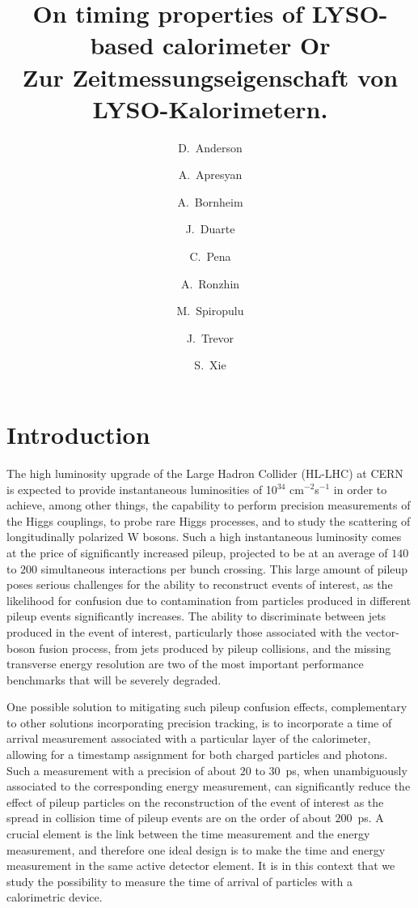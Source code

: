 \documentclass[12pt]{article}
\title{On timing properties of LYSO-based calorimeter Or\\Zur Zeitmessungseigenschaft von LYSO-Kalorimetern.}
\author[1]{D.~Anderson}
\author[1]{A.~Apresyan}
\author[1]{A.~Bornheim}
\author[1]{J.~Duarte}
\author[1]{C.~Pena}
\author[2]{A.~Ronzhin}
\author[1]{M.~Spiropulu}
\author[1]{J.~Trevor}
\author[1]{S.~Xie}
\affil[1]{California Institute of Technology, Pasadena, CA, USA}
\affil[2]{Fermi National Accelerator Laboratory, Batavia, IL, USA}
\date{}
\begin{document}
\maketitle
{}



\section{Introduction}

The high luminosity upgrade of the Large Hadron Collider (HL-LHC) at CERN~\cite{Rossi:1471000}
is expected to provide instantaneous luminosities of 10$^{34}$ cm$^{-2}$s$^{-1}$
in order to achieve, among other things, the capability to perform precision 
measurements of the Higgs couplings, to probe rare Higgs processes,
and to study the scattering of longitudinally polarized W bosons. Such a
high instantaneous luminosity comes at the price of significantly increased
pileup, projected to be at an average of $140$ to $200$ simultaneous 
interactions per bunch crossing. This large amount of pileup poses serious
challenges for the ability to reconstruct events of interest, as the 
likelihood for confusion due to contamination from particles produced
in different pileup events significantly increases. The ability to
discriminate between jets produced in the event of interest,
particularly those associated with the vector-boson fusion process,
from jets produced by pileup collisions, and the missing transverse energy
resolution are two of the most important performance benchmarks
that will be severely degraded.

One possible solution to mitigating such pileup confusion effects,
complementary to other solutions incorporating precision tracking,
is to incorporate a time of arrival measurement associated with a
particular layer of the calorimeter, allowing for a timestamp
assignment for both charged particles and photons. Such a measurement
with a precision of about $20$ to $30$~ps, when unambiguously
associated to the corresponding energy measurement, can significantly reduce
the effect of pileup particles on the reconstruction of the
event of interest as the spread in collision time of pileup events
are on the order of about $200$~ps. A crucial element is
the link between the time measurement and the energy measurement,
and therefore one ideal design is to make the time and energy
measurement in the same active detector element. It is in this context 
that we study the possibility to measure the time of arrival of 
particles with a calorimetric device.
\end{document}
